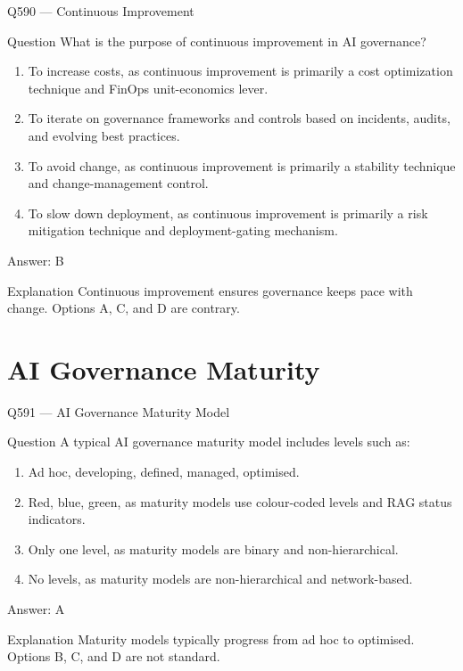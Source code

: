 \documentclass[aspectratio=169,8pt]{beamer}
\begin{document}
	\begin{frame}{Q590 --- Continuous Improvement}
		\begin{block}{Question}
			What is the purpose of continuous improvement in AI governance?
			\begin{enumerate}
				\item To increase costs, as continuous improvement is primarily a cost optimization technique and FinOps unit-economics lever.
				\item To iterate on governance frameworks and controls based on incidents, audits, and evolving best practices.
				\item To avoid change, as continuous improvement is primarily a stability technique and change-management control.
				\item To slow down deployment, as continuous improvement is primarily a risk mitigation technique and deployment-gating mechanism.
			\end{enumerate}
		\end{block}
		\begin{exampleblock}{Answer: B}\end{exampleblock}
		\begin{block}{Explanation}
			Continuous improvement ensures governance keeps pace with change. Options A, C, and D are contrary.
		\end{block}
	\end{frame}
	
	\section{AI Governance Maturity}
	
	\begin{frame}{Q591 --- AI Governance Maturity Model}
		\begin{block}{Question}
			A typical AI governance maturity model includes levels such as:
			\begin{enumerate}
				\item Ad hoc, developing, defined, managed, optimised.
				\item Red, blue, green, as maturity models use colour-coded levels and RAG status indicators.
				\item Only one level, as maturity models are binary and non-hierarchical.
				\item No levels, as maturity models are non-hierarchical and network-based.
			\end{enumerate}
		\end{block}
		\begin{exampleblock}{Answer: A}\end{exampleblock}
		\begin{block}{Explanation}
			Maturity models typically progress from ad hoc to optimised. Options B, C, and D are not standard.
		\end{block}
	\end{frame}
	
\end{document}
